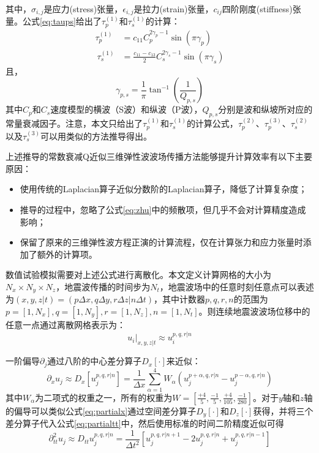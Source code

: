 \documentclass[degree=doctor]{thuthesis}
\begin{document}
其中，$\sigma_{i,j}$是应力(stress)张量，$\epsilon_{i,j}$是拉力(strain)张量，$c_{ij}$四阶刚度(stiffness)张量。公式\ref{eq:taups}给出了$\tau_p^{(1)}$和$\tau_s^{(1)}$的计算：
\begin{equation}
\begin{aligned}
  \tau_p^{(1)} &= c_{11}C_p^{2\gamma_p - 1}\sin(\pi \gamma_p) \\
  ~
  \tau_s^{(1)} &= \frac{c_{11} - c_{13}}{2}C_s^{2\gamma_s - 1}\sin(\pi \gamma_s)
\end{aligned}
\label{eq:taups}
\end{equation}
且，
\begin{equation}
  \gamma_{p,s}=\frac{1}{\pi}\tan^{-1}(\frac{1}{Q_{p,s}})
\end{equation}
其中$C_p$和$C_s$速度模型的横波（S波）和纵波（P波），$Q_{p,s}$分别是波和纵坡所对应的常量衰减因子。注意，本文只给出了$\tau_p^{(1)}$和$\tau_s^{(1)}$的计算公式，$\tau_p^{(2)}$、$\tau_p^{(3)}$、$\tau_s^{(2)}$以及$\tau_s^{(3)}$可以用类似的方法推导得出。

上述推导的常数衰减Q近似三维弹性波波场传播方法能够提升计算效率有以下主要原因：
\begin{itemize}
  \item 使用传统的Laplacian算子近似分数阶的Laplacian算子，降低了计算复杂度；
  \item 推导的过程中，忽略了公式\ref{eq:zhu}中的频散项，但几乎不会对计算精度造成影响\cite{shen2015image}；
  \item 保留了原来的三维弹性波方程正演的计算流程，仅在计算张力和应力张量时添加了额外的计算项。
\end{itemize}

数值试验模拟需要对上述公式进行离散化。本文定义计算网格的大小为$N_x \times N_y \times N_z$，地震波传播的时间步为$N_t$，地震波场中的任意时刻任意点可以表述为$(x,y,z|t)=(p\Delta x,q\Delta y, r\Delta z| n\Delta t)$，其中计数器$p,q,r,n$的范围为$p=[1,N_x], q=[1,N_y], r=[1,N_z], n=[1,N_t]$。则连续地震波波场位移中的任意一点通过离散网格表示为：
\begin{equation}
  u_i|_{x,y,z|t} \approx u_i^{p,q,r|n}
\end{equation}

一阶偏导$\partial_j$通过八阶的中心差分算子$D_x[\cdot]$来近似\cite{trefethen1996finite}：
\begin{equation}
  \partial_x u_j \approx D_x[u_j^{p,q,r|n}] = \frac{1}{\Delta x}\sum_{\alpha=1}^4W_\alpha\left(u_j^{p+\alpha,q,r|n} - u_j^{p-\alpha,q,r|n}\right)
  \label{eq:partialx}
\end{equation}
其中$W_\alpha$为二项式的权重之一，所有的权重为$W=\left[ \frac{+4}{5}, \frac{-1}{5}, \frac{+4}{105}, \frac{-1}{280}\right]$。对于$y$轴和$z$轴的偏导可以类似公式\ref{eq:partialx}通过空间差分算子$D_y[\cdot]$和$D_z[\cdot]$获得，并将三个差分算子代入公式\ref{eq:partialtt}中，然后使用标准的时间二阶精度近似可得
\begin{equation}
  \partial_{tt}^2u_j \approx D_{tt}u_j^{p,q,r|n}=\frac{1}{\Delta t^2}\left[ u_j^{p,q,r|n+1} - 2u_j^{p,q,r|n} + u_j^{p,q,r|n-1} \right]
\end{equation}
\end{document}
